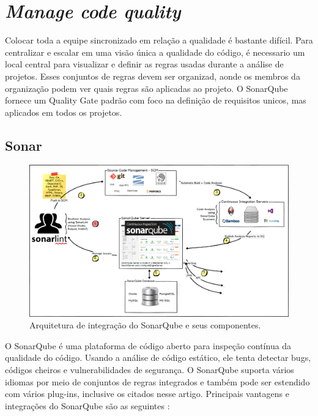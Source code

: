 \documentclass[12pt]{article}
\begin{document}
\section{\textit{Manage code quality}} \label{sec:managecodequality}

Colocar toda a equipe sincronizado em relação a qualidade é bastante difícil. Para centralizar e escalar em uma visão única a qualidade do código, é necessario um local central para visualizar e definir as regras usadas durante a análise de projetos. Esses conjuntos de regras devem ser organizad, aonde os membros da organização podem ver quais regras são aplicadas ao projeto.
O SonarQube\cite{SONARQUBE} fornece um Quality Gate padrão com foco na definição de requisitos unicos, mas aplicados em todos os projetos.

\subsection{Sonar} \label{sec:sonar}

\begin{figure}[h]
	\centering
		\includegraphics[scale=0.25]{img/img-sonar.png}
	\caption{Arquitetura\cite{SONARQUBE} de integração do SonarQube e seus componentes.}
	\label{fig:sonar-arquitetura}
\end{figure}

O SonarQube\cite{SONAR} é uma plataforma de código aberto para inspeção contínua da qualidade do código. Usando a análise de código estático, ele tenta detectar bugs, códigos cheiros e vulnerabilidades de segurança. O SonarQube suporta vários idiomas por meio de conjuntos de regras integrados e também pode ser estendido com vários plug-ins, inclusive os citados nesse artigo.
Principais vantagens e integrações do SonarQube são as seguintes \cite{SONARQUBE_IN_ACTION}:
\end{document}
